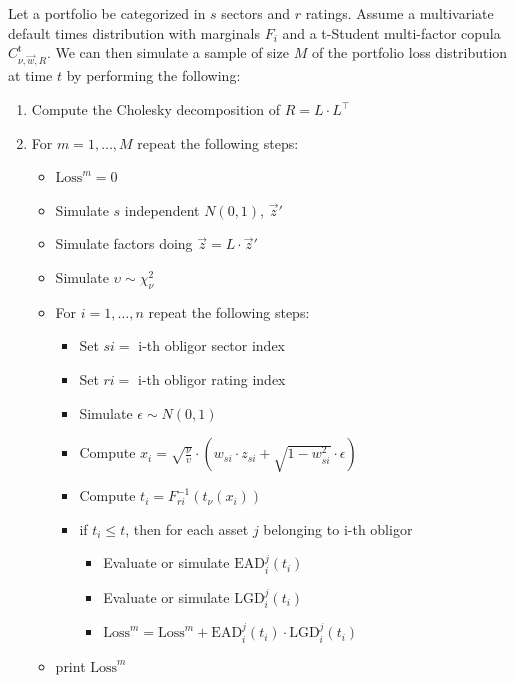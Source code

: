 \documentclass[11pt,fleqn]{book} %
\begin{document}
\begin{algorithm}
	\label{alg:pldmc}
	Let a portfolio be categorized in $s$ sectors and $r$ ratings.
	Assume a multivariate default times distribution with marginals $F_i$
	and a t-Student multi-factor copula $C_{\nu,\vec{w},R}^{\text{t}}$.
	We can then simulate a sample of size $M$ of the portfolio loss distribution
	at time $t$ by performing the following:
	\begin{enumerate}
		\item Compute the Cholesky decomposition of $R = L \cdot L^\intercal$
		\item For $m=1,\dots,M$ repeat the following steps:
		\begin{itemize}
			\item $\text{Loss}^m = 0$
			\item Simulate $s$ independent $N(0,1)$, $\vec{z}'$
			\item Simulate factors doing $\vec{z} = L \cdot \vec{z}'$
			\item Simulate $\upsilon \sim \chi_{\nu}^2$
			\item For $i=1,\dots,n$ repeat the following steps:
			\begin{itemize}
				\item Set $si = $ i-th obligor sector index
				\item Set $ri = $ i-th obligor rating index
				\item Simulate $\epsilon \sim N(0,1)$
				\item Compute $x_i = \sqrt{\frac{\nu}{\upsilon}} \cdot \left( w_{si} \cdot z_{si} + \sqrt{1-w_{si}^2} \cdot \epsilon \right)$
				\item Compute $t_i = F_{ri}^{-1}\left(t_{\nu}(x_i)\right)$
				\item if $t_i \le t$, then for each asset $j$ belonging to i-th obligor
				\begin{itemize}
					\item Evaluate or simulate $\text{EAD}_i^j(t_i)$
					\item Evaluate or simulate $\text{LGD}_i^j(t_i)$
					\item $\text{Loss}^m = \text{Loss}^m + \text{EAD}_i^j(t_i) \cdot \text{LGD}_i^j(t_i)$
				\end{itemize}
			\end{itemize}
			\item print $\text{Loss}^m$
		\end{itemize}
	\end{enumerate}
\end{algorithm}
\end{document}
